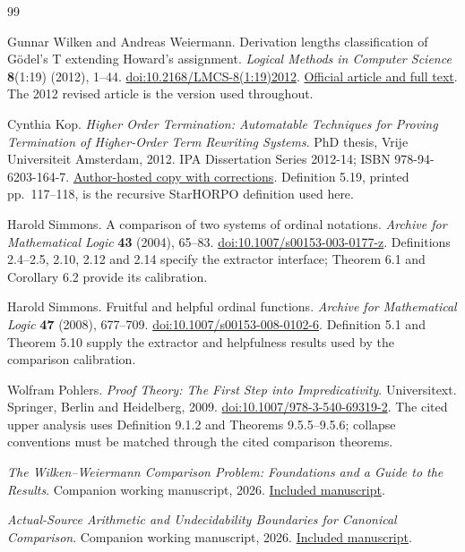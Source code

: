 \begin{thebibliography}{99}

Gunnar Wilken and Andreas Weiermann.
Derivation lengths classification of G\"odel's T extending Howard's assignment.
\emph{Logical Methods in Computer Science} \textbf{8}(1:19) (2012), 1--44.
\href{https://doi.org/10.2168/LMCS-8(1:19)2012}
{doi:10.2168/LMCS-8(1:19)2012}.
\href{https://lmcs.episciences.org/1073}{Official article and full text}.
The 2012 revised article is the version used throughout.

Cynthia Kop.
\emph{Higher Order Termination: Automatable Techniques for Proving
Termination of Higher-Order Term Rewriting Systems}.
PhD thesis, Vrije Universiteit Amsterdam, 2012.
IPA Dissertation Series 2012-14; ISBN 978-94-6203-164-7.
\href{https://www.cs.ru.nl/~cynthiakop/phdthesis.pdf}
{Author-hosted copy with corrections}.
Definition 5.19, printed pp.~117--118, is the recursive StarHORPO
definition used here.

Harold Simmons.
A comparison of two systems of ordinal notations.
\emph{Archive for Mathematical Logic} \textbf{43} (2004), 65--83.
\href{https://doi.org/10.1007/s00153-003-0177-z}
{doi:10.1007/s00153-003-0177-z}.
Definitions 2.4--2.5, 2.10, 2.12 and 2.14 specify the extractor
interface; Theorem 6.1 and Corollary 6.2 provide its calibration.

Harold Simmons.
Fruitful and helpful ordinal functions.
\emph{Archive for Mathematical Logic} \textbf{47} (2008), 677--709.
\href{https://doi.org/10.1007/s00153-008-0102-6}
{doi:10.1007/s00153-008-0102-6}.
Definition 5.1 and Theorem 5.10 supply the extractor and helpfulness
results used by the comparison calibration.

Wolfram Pohlers.
\emph{Proof Theory: The First Step into Impredicativity}.
Universitext. Springer, Berlin and Heidelberg, 2009.
\href{https://doi.org/10.1007/978-3-540-69319-2}
{doi:10.1007/978-3-540-69319-2}.
The cited upper analysis uses Definition 9.1.2 and
Theorems 9.5.5--9.5.6; collapse conventions must be matched through the cited comparison theorems.

\emph{The Wilken--Weiermann Comparison Problem: Foundations and a Guide to the Results}. Companion working manuscript, 2026.
\href{../05-wilken-weiermann-foundations/paper.pdf}{Included manuscript}.

\emph{Actual-Source Arithmetic and Undecidability Boundaries for Canonical Comparison}. Companion working manuscript, 2026.
\href{../09-canonical-source-expressivity/paper.pdf}{Included manuscript}.
\end{thebibliography}
